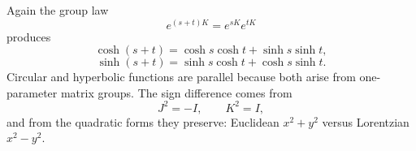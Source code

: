 Again the group law
\[
  e^{(s+t)K}=e^{sK}e^{tK}
\]
produces
\[
  \cosh(s+t)=\cosh s\cosh t+\sinh s\sinh t,
\]
\[
  \sinh(s+t)=\sinh s\cosh t+\cosh s\sinh t.
\]
Circular and hyperbolic functions are parallel because both arise from one-parameter matrix groups.  The sign difference comes from
\[
  J^2=-I,
  \qquad
  K^2=I,
\]
and from the quadratic forms they preserve: Euclidean \(x^2+y^2\) versus Lorentzian \(x^2-y^2\).
